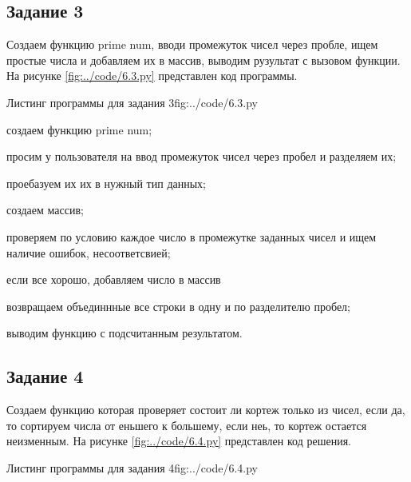 \documentclass{vvsu}
\begin{document}
\subsection{Задание 3}
  Создаем функцию prime num, вводи промежуток чисел через пробле, ищем простые числа и добавляем их в массив, выводим рузультат с вызовом функции. На рисунке \ref{fig:../code/6.3.py} представлен код программы.

\begin{vvsu_figure}{Листинг программы для задания 3}{fig:../code/6.3.py}
  \begin{minipage}{.75\textwidth}
    
  \end{minipage}
\end{vvsu_figure}

\begin{vvsu_list}
  \item создаем функцию prime num;
  \item просим у пользователя на ввод промежуток чисел через пробел и разделяем их;
  \item проебазуем их их в нужный тип данных;
  \item создаем массив;
  \item проверяем по условию каждое число в промежутке заданных чисел и ищем наличие ошибок, несоответсвией;
  \item если все хорошо, добавляем число в массив
  \item возвращаем объединнные все строки в одну и по разделителю пробел;
  \item выводим функцию с подсчитанным результатом.
\end{vvsu_list}

\subsection{Задание 4}
  Создаем функцию которая проверяет состоит ли кортеж только из чисел, если да, то сортируем числа от еньшего к большему, если неь, то кортеж остается неизменным. На рисунке  \ref{fig:../code/6.4.py} представлен код решения.

\begin{vvsu_figure}{Листинг программы для задания 4}{fig:../code/6.4.py}
  \begin{minipage}{.75\textwidth}
    
  \end{minipage}
\end{vvsu_figure}
\end{document}

